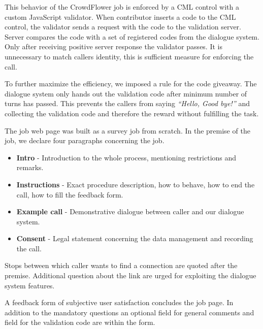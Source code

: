 This behavior of the CrowdFlower job is enforced by a \ac{CML} control with a custom JavaScript validator.
When contributor inserts a code to the \ac{CML} control, the validator sends a request with the code to the validation server.
Server compares the code with a set of registered codes from the dialogue system.
Only after receiving positive server response the validator passes.
It is unnecessary to match callers identity, this is sufficient measure for enforcing the call.

To further maximize the efficiency, we imposed a rule for the code giveaway.
The dialogue system only hands out the validation code after minimum number of turns has passed.
This prevents the callers from saying \textit{``Hello, Good bye!''} and collecting the validation code and therefore the reward without fulfilling the task.

The job web page was built as a survey job from scratch.
In the premise of the job, we declare four paragraphs concerning the job.

\begin{itemize}
	\item \textbf{Intro} - Introduction to the whole process, mentioning restrictions and remarks. %
	\item \textbf{Instructions} - Exact procedure description,  how to behave, how to end the call, how to fill the feedback form.
	\item \textbf{Example call} - Demonstrative dialogue between caller and our dialogue system.
	\item \textbf{Consent} - Legal statement concerning the data management and recording the call.
\end{itemize}


Stops between which caller wants to find a connection are quoted after the premise.
Additional question about the link are urged for exploiting the dialogue system features.

A feedback form of subjective user satisfaction concludes the job page.
In addition to the mandatory questions an optional field for general comments and field for the validation code are within the form.

